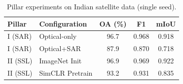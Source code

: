 \begin{table}[h]
\centering
\caption{Pillar experiments on Indian satellite data (single seed).}
\label{tab:pillars}
\begin{tabular}{llccc}
\toprule
Pillar & Configuration & OA (\%) & F1 & mIoU \\
\midrule
I (SAR) & Optical-only & 96.7 & 0.968 & 0.918 \\
I (SAR) & Optical+SAR & 87.9 & 0.870 & 0.718 \\
\midrule
II (SSL) & ImageNet Init & 96.9 & 0.969 & 0.922 \\
II (SSL) & SimCLR Pretrain & 93.2 & 0.931 & 0.835 \\
\bottomrule
\end{tabular}
\end{table}